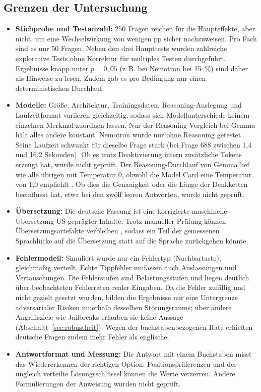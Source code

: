\documentclass[a4paper,titlepage]{article}
\numberwithin{equation}{section} %
\begin{document}

\subsection{Grenzen der Untersuchung}\label{sec:grenzen}

\begin{itemize}
\item \textbf{Stichprobe und Testanzahl:} 250 Fragen reichen für die Haupteffekte, aber nicht, um eine Wechselwirkung von wenigen pp sicher nachzuweisen. Pro Fach sind es nur 50 Fragen. Neben den drei Haupttests wurden zahlreiche explorative Tests ohne Korrektur für multiples Testen durchgeführt. Ergebnisse knapp unter $p = 0{,}05$ (z.\,B. bei Nemotron bei 15~\%) sind daher als Hinweise zu lesen. Zudem gab es pro Bedingung nur einen deterministischen Durchlauf.

\item \textbf{Modelle:} Größe, Architektur, Trainingsdaten, Reasoning-Auslegung und Laufzeitformat variieren gleichzeitig, sodass sich Modellunterschiede keinem einzelnen Merkmal zuordnen lassen. Nur der Reasoning-Vergleich bei Gemma hält alles andere konstant. Nemotron wurde nur ohne Reasoning getestet. Seine Laufzeit schwankt für dieselbe Frage stark (bei Frage 688 zwischen 1,4 und 16,2 Sekunden). Ob es trotz Deaktivierung intern zusätzliche Tokens erzeugt hat, wurde nicht geprüft. Der Reasoning-Durchlauf von Gemma lief wie alle übrigen mit Temperatur 0, obwohl die Model Card eine Temperatur von 1,0 empfiehlt \citep{deepmind_gemma_nodate}. Ob dies die Genauigkeit oder die Länge der Denkketten beeinflusst hat, etwa bei den zwölf leeren Antworten, wurde nicht geprüft.

\item \textbf{Übersetzung:} Die deutsche Fassung ist eine korrigierte maschinelle Übersetzung US-geprägter Inhalte. Trotz manueller Prüfung können Übersetzungsartefakte verbleiben \citep{artetxe_translation_2020}, sodass ein Teil der gemessenen Sprachlücke auf die Übersetzung statt auf die Sprache zurückgehen könnte.

\item \textbf{Fehlermodell:} Simuliert wurde nur ein Fehlertyp (Nachbartaste), gleichmäßig verteilt. Echte Tippfehler umfassen auch Auslassungen und Vertauschungen. Die Fehlerstufen sind Belastungsstufen und liegen deutlich über beobachteten Fehlerraten realer Eingaben. Da die Fehler zufällig und nicht gezielt gesetzt wurden, bilden die Ergebnisse nur eine Untergrenze adversarialer Risiken innerhalb desselben Störungsraums; über andere Angriffsziele wie Jailbreaks erlauben sie keine Aussage (Abschnitt~\ref{sec:robustheit}). Wegen der buchstabenbezogenen Rate erhielten deutsche Fragen zudem mehr Fehler als englische.

\item \textbf{Antwortformat und Messung:} Die Antwort mit einem Buchstaben misst das Wiedererkennen der richtigen Option. Positionspräferenzen und der ungleich verteilte Lösungsschlüssel können die Werte verzerren. Andere Formulierungen der Anweisung wurden nicht geprüft.
\end{itemize}
\end{document}
